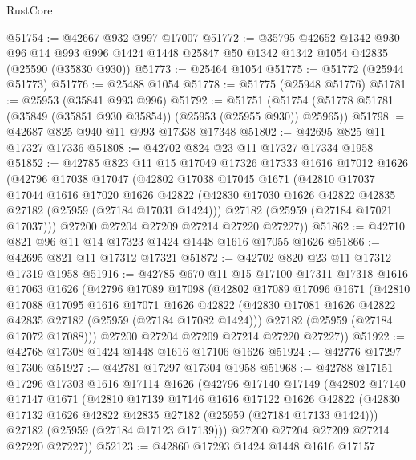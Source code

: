 \begin{lexlean}{RustCore}
\begin{coremodule}
@51754 := @42667 @932 @997 @17007
@51772 := @35795
    @42652
    @1342
    @930
    @96
    @14
    @993
    @996
    @1424
    @1448
    @25847
    @50
    @1342
    @1342
    @1054
    @42835
    (@25590 (@35830 @930))
@51773 := @25464 @1054
@51775 := @51772 (@25944 @51773)
@51776 := @25488 @1054
@51778 := @51775 (@25948 @51776)
@51781 := @25953 (@35841 @993 @996)
@51792 := @51751
    (@51754 (@51778 @51781 (@35849 (@35851 @930 @35854)) (@25953 (@25955 @930)) @25965))
@51798 := @42687 @825 @940 @11 @993 @17338 @17348
@51802 := @42695 @825 @11 @17327 @17336
@51808 := @42702 @824 @23 @11 @17327 @17334 @1958
@51852 := @42785
    @823
    @11
    @15
    @17049
    @17326
    @17333
    @1616
    @17012
    @1626
    (@42796
      @17038
      @17047
      (@42802
        @17038
        @17045
        @1671
        (@42810
          @17037
          @17044
          @1616
          @17020
          @1626
          @42822
          (@42830 @17030 @1626 @42822 @42835 @27182 (@25959 (@27184 @17031 @1424)))
          @27182
          (@25959 (@27184 @17021 @17037)))
        @27200
        @27204
        @27209
        @27214
        @27220
        @27227))
@51862 := @42710 @821 @96 @11 @14 @17323 @1424 @1448 @1616 @17055 @1626
@51866 := @42695 @821 @11 @17312 @17321
@51872 := @42702 @820 @23 @11 @17312 @17319 @1958
@51916 := @42785
    @670
    @11
    @15
    @17100
    @17311
    @17318
    @1616
    @17063
    @1626
    (@42796
      @17089
      @17098
      (@42802
        @17089
        @17096
        @1671
        (@42810
          @17088
          @17095
          @1616
          @17071
          @1626
          @42822
          (@42830 @17081 @1626 @42822 @42835 @27182 (@25959 (@27184 @17082 @1424)))
          @27182
          (@25959 (@27184 @17072 @17088)))
        @27200
        @27204
        @27209
        @27214
        @27220
        @27227))
@51922 := @42768 @17308 @1424 @1448 @1616 @17106 @1626
@51924 := @42776 @17297 @17306
@51927 := @42781 @17297 @17304 @1958
@51968 := @42788
    @17151
    @17296
    @17303
    @1616
    @17114
    @1626
    (@42796
      @17140
      @17149
      (@42802
        @17140
        @17147
        @1671
        (@42810
          @17139
          @17146
          @1616
          @17122
          @1626
          @42822
          (@42830 @17132 @1626 @42822 @42835 @27182 (@25959 (@27184 @17133 @1424)))
          @27182
          (@25959 (@27184 @17123 @17139)))
        @27200
        @27204
        @27209
        @27214
        @27220
        @27227))
@52123 := @42860
    @17293
    @1424
    @1448
    @1616
    @17157

\end{coremodule}
\end{lexlean}
